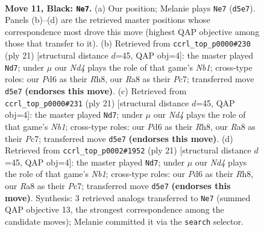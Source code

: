 \documentclass[11pt]{article}
\begin{document}
\clearpage

\begin{figure}[p]\centering
\begin{subfigure}{0.46\textwidth}\centering
\resizebox{\linewidth}{!}{%
\newchessgame
\chessboard[
  setfen={r1b1kb1r/p4ppp/2pp4/3n4/8/N4P2/PPP1B1PP/R1B1K2R b KQkq - 1 11},
  showmover=false,
  pgfstyle=straightmove, color=movearrow, markmove={d5-e7}
]}
\caption{}
\end{subfigure}\hfill
\begin{subfigure}{0.46\textwidth}\centering
\resizebox{\linewidth}{!}{%
\newchessgame
\chessboard[
  setfen={rn2kb1r/p1p2ppp/1p2p3/6B1/2PP4/2P2P2/P4P1P/R3KB1R b KQkq - 0 11},
  showmover=false,
  pgfstyle=straightmove, color=movearrow, markmove={b8-d7}
]}
\caption{}
\end{subfigure}
\\[4pt]
\begin{subfigure}{0.46\textwidth}\centering
\resizebox{\linewidth}{!}{%
\newchessgame
\chessboard[
  setfen={rn2kb1r/p1p2ppp/1p2p3/6B1/2PP4/2P2P2/P4P1P/R3KB1R b KQkq - 0 11},
  showmover=false,
  pgfstyle=straightmove, color=movearrow, markmove={b8-d7}
]}
\caption{}
\end{subfigure}\hfill
\begin{subfigure}{0.46\textwidth}\centering
\resizebox{\linewidth}{!}{%
\newchessgame
\chessboard[
  setfen={rn2kb1r/p1p2ppp/1p2p3/6B1/2PP4/2P2P2/P4P1P/R3KB1R b KQkq - 0 11},
  showmover=false,
  pgfstyle=straightmove, color=movearrow, markmove={b8-d7}
]}
\caption{}
\end{subfigure}
\caption{\textbf{Move 11, Black: \texttt{Ne7}.} (a) Our position; Melanie plays \texttt{Ne7} (\texttt{d5e7}). Panels (b)--(d) are the retrieved master positions whose correspondence most drove this move (highest QAP objective among those that transfer to it). (b) Retrieved from \texttt{ccrl\_top\_p0000\#230} (ply 21) [structural distance $d$=45, QAP obj=4]: the master played \texttt{Nd7}; under $\mu$ our \emph{Nd4} plays the role of that game's \emph{Nb1}; cross-type roles: our \emph{P}d6 as their \emph{R}h8, our \emph{R}a8 as their \emph{P}c7; transferred move \texttt{d5e7} \textbf{(endorses this move)}. (c) Retrieved from \texttt{ccrl\_top\_p0000\#231} (ply 21) [structural distance $d$=45, QAP obj=4]: the master played \texttt{Nd7}; under $\mu$ our \emph{Nd4} plays the role of that game's \emph{Nb1}; cross-type roles: our \emph{P}d6 as their \emph{R}h8, our \emph{R}a8 as their \emph{P}c7; transferred move \texttt{d5e7} \textbf{(endorses this move)}. (d) Retrieved from \texttt{ccrl\_top\_p0002\#1952} (ply 21) [structural distance $d$=45, QAP obj=4]: the master played \texttt{Nd7}; under $\mu$ our \emph{Nd4} plays the role of that game's \emph{Nb1}; cross-type roles: our \emph{P}d6 as their \emph{R}h8, our \emph{R}a8 as their \emph{P}c7; transferred move \texttt{d5e7} \textbf{(endorses this move)}. Synthesis: 3 retrieved analogs transferred to \texttt{Ne7} (summed QAP objective 13, the strongest correspondence among the candidate moves); Melanie committed it via the \texttt{search} selector.}
\label{fig:thought-m21}
\end{figure}
\end{document}
